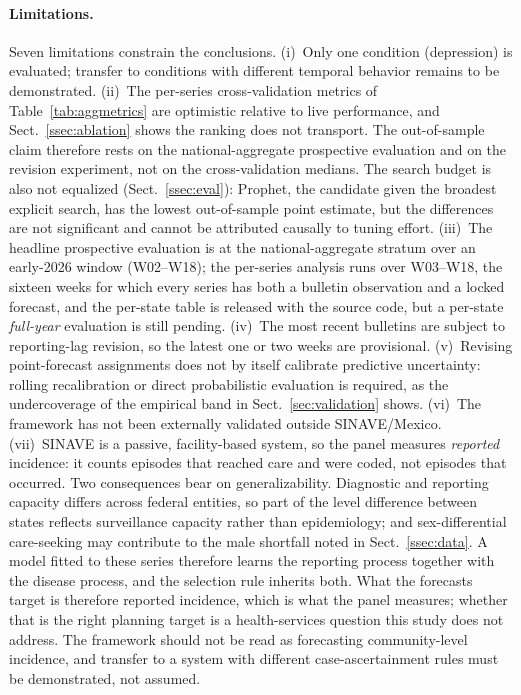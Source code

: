 \documentclass[runningheads]{llncs}
\begin{document}
\paragraph{Limitations.}
Seven limitations constrain the conclusions. (i)~Only one condition
(depression) is evaluated; transfer to conditions with different
temporal behavior remains to be demonstrated. (ii)~The per-series
cross-validation metrics of Table~\ref{tab:aggmetrics} are optimistic
relative to live performance, and Sect.~\ref{ssec:ablation} shows the
ranking does not transport. The out-of-sample claim therefore rests on
the national-aggregate prospective evaluation and on the revision
experiment, not on the cross-validation medians. The search budget is
also not equalized (Sect.~\ref{ssec:eval}): Prophet, the candidate given
the broadest explicit search, has the lowest out-of-sample point
estimate, but the differences are not significant and cannot be
attributed causally to tuning effort. (iii)~The headline prospective
evaluation is at the national-aggregate stratum over an early-2026
window (W02--W18); the per-series analysis runs over W03--W18, the
sixteen weeks for which every series has both a bulletin observation and
a locked forecast, and the per-state table is released with the source
code, but a per-state \emph{full-year} evaluation is still pending. (iv)~The
most recent bulletins are subject to reporting-lag revision, so the
latest one or two weeks are provisional. (v)~Revising point-forecast
assignments does not by itself calibrate predictive uncertainty:
rolling recalibration or direct probabilistic evaluation is required,
as the undercoverage of the empirical band in
Sect.~\ref{sec:validation} shows. (vi)~The framework has not been
externally validated outside SINAVE/Mexico. (vii)~SINAVE is a
passive, facility-based system, so the panel measures \emph{reported}
incidence: it counts episodes that reached care and were coded, not
episodes that occurred. Two consequences bear on generalizability.
Diagnostic and reporting capacity differs across federal entities, so
part of the level difference between states reflects surveillance
capacity rather than epidemiology; and sex-differential care-seeking may
contribute to the male shortfall noted in
Sect.~\ref{ssec:data}. A model fitted to these series therefore learns
the reporting process together with the disease process, and the
selection rule inherits both. What the forecasts
target is therefore reported incidence, which is what the panel measures;
whether that is the right planning target is a health-services question this
study does not address. The framework should not be read as
forecasting community-level incidence, and transfer to a system with
different case-ascertainment rules must be demonstrated, not assumed.
\end{document}
